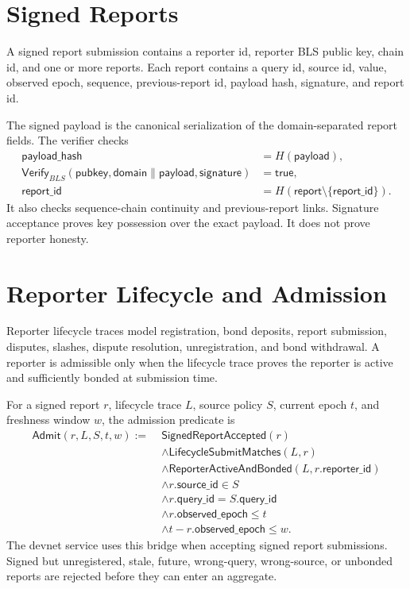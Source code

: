 \documentclass[11pt]{article}
\begin{document}
\section{Signed Reports}

A signed report submission contains a reporter id, reporter BLS public key,
chain id, and one or more reports. Each report contains a query id, source id,
value, observed epoch, sequence, previous-report id, payload hash, signature,
and report id.

The signed payload is the canonical serialization of the domain-separated
report fields. The verifier checks
\[
\begin{aligned}
  \mathsf{payload\_hash} &= H(\mathsf{payload}),\\
  \mathsf{Verify}_{BLS}(\mathsf{pubkey}, \mathsf{domain} \parallel \mathsf{payload},
  \mathsf{signature}) &= \mathsf{true},\\
  \mathsf{report\_id} &= H(\mathsf{report} \setminus \{\mathsf{report\_id}\}).
\end{aligned}
\]
It also checks sequence-chain continuity and previous-report links. Signature
acceptance proves key possession over the exact payload. It does not prove
reporter honesty.

\section{Reporter Lifecycle and Admission}

Reporter lifecycle traces model registration, bond deposits, report
submission, disputes, slashes, dispute resolution, unregistration, and bond
withdrawal. A reporter is admissible only when the lifecycle trace proves the
reporter is active and sufficiently bonded at submission time.

For a signed report \(r\), lifecycle trace \(L\), source policy \(S\), current
epoch \(t\), and freshness window \(w\), the admission predicate is
\[
\begin{aligned}
\mathsf{Admit}(r,L,S,t,w) :=\;&
  \mathsf{SignedReportAccepted}(r)\\
  &\land \mathsf{LifecycleSubmitMatches}(L,r)\\
  &\land \mathsf{ReporterActiveAndBonded}(L,r.\mathsf{reporter\_id})\\
  &\land r.\mathsf{source\_id} \in S\\
  &\land r.\mathsf{query\_id} = S.\mathsf{query\_id}\\
  &\land r.\mathsf{observed\_epoch} \leq t\\
  &\land t-r.\mathsf{observed\_epoch} \leq w.
\end{aligned}
\]
The devnet service uses this bridge when accepting signed report submissions.
Signed but unregistered, stale, future, wrong-query, wrong-source, or
unbonded reports are rejected before they can enter an aggregate.
\end{document}

